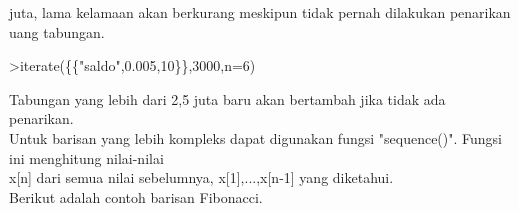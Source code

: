 \documentclass{article}
\begin{document}
\begin{eulernotebook}
\begin{eulercomment}
\begin{eulercomment}
\begin{eulercomment}
\begin{eulercomment}
\begin{eulercomment}
\begin{eulercomment}
\begin{eulercomment}
\begin{eulercomment}
\begin{eulercomment}
\begin{eulercomment}
\begin{eulercomment}
\begin{eulercomment}
\begin{eulercomment}
\begin{eulercomment}
\begin{eulercomment}
\begin{eulercomment}
\begin{eulercomment}
\begin{eulercomment}
\begin{eulercomment}
\begin{eulercomment}
\begin{eulercomment}
\begin{eulercomment}
\begin{eulercomment}
\begin{eulercomment}
\begin{eulercomment}
\begin{eulercomment}
\begin{eulercomment}
\begin{eulercomment}
\begin{eulercomment}
juta, lama kelamaan akan berkurang meskipun tidak pernah dilakukan
penarikan uang tabungan.
\end{eulercomment}
\begin{eulerprompt}
>iterate(\{\{"saldo",0.005,10\}\},3000,n=6)
\end{eulerprompt}
\begin{euleroutput}
  [3000,  3002,  3004.01,  3006.03,  3008.05,  3010.08,  3012.12]
\end{euleroutput}
\begin{eulercomment}
Tabungan yang lebih dari 2,5 juta baru akan bertambah jika tidak ada
penarikan.\\
Untuk barisan yang lebih kompleks dapat digunakan fungsi "sequence()".
Fungsi ini menghitung nilai-nilai\\
x[n] dari semua nilai sebelumnya, x[1],...,x[n-1] yang diketahui.\\
Berikut adalah contoh barisan Fibonacci.


\end{eulercomment}
\end{eulercomment}
\end{eulercomment}
\end{eulercomment}
\end{eulercomment}
\end{eulercomment}
\end{eulercomment}
\end{eulercomment}
\end{eulercomment}
\end{eulercomment}
\end{eulercomment}
\end{eulercomment}
\end{eulercomment}
\end{eulercomment}
\end{eulercomment}
\end{eulercomment}
\end{eulercomment}
\end{eulercomment}
\end{eulercomment}
\end{eulercomment}
\end{eulercomment}
\end{eulercomment}
\end{eulercomment}
\end{eulercomment}
\end{eulercomment}
\end{eulercomment}
\end{eulercomment}
\end{eulercomment}
\end{eulercomment}
\end{eulernotebook}
\end{document}
